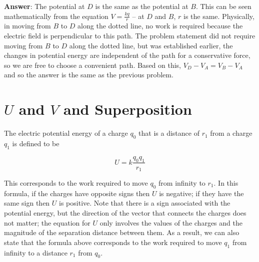 \documentclass{article}
\begin{document}
\begin{enumerate}
        \ifsolutions
        \textbf{Answer}: The potential at $D$ is the same as the potential at $B$. This can be seen mathematically from the equation $V=\frac{kq}{r}$ -- at $D$ and $B$, $r$ is the same. Physically, in moving from $B$ to $D$ along the dotted line, no work is required because the electric field is perpendicular to this path. The problem statement did not require moving from $B$ to $D$ along the dotted line, but was established earlier, the changes in potential energy are independent of the path for a conservative force, so we are free to choose a convenient path. Based on this, $V_D-V_A=V_B-V_A$ and so the answer is the same as the previous problem.
        \else
        \vskip 48pt
        \fi

\end{enumerate}

\newpage

\section{$U$ and $V$ and Superposition}






The electric potential energy of a charge $q_0$ that is a distance of $r_1$ from a charge $q_1$ is defined to be 

\begin{equation}
U=k\frac{q_0q_1}{r_1}
\end{equation}

This corresponds to the work required to move $q_0$ from infinity to $r_1$. 
In this formula, if the charges have opposite signs then $U$ is negative; if they have the same sign then $U$  is positive. Note that there is a sign associated with the potential energy, but the direction of the vector that connects the charges does not matter; the equation for $U$ only involves the values of the charges and the magnitude of the separation distance between them. As a result, we can also state that the formula above corresponds to the work required to move $q_1$ from infinity to a distance $r_1$ from $q_0$.
\end{document}
